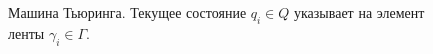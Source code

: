 \begin{figure}
\centering



\caption{Машина Тьюринга. Текущее состояние $q_i \in Q$ указывает на
  элемент ленты $\gamma_i \in \Gamma$.} 
\label{figAddAlgoTuring}
\end{figure}
